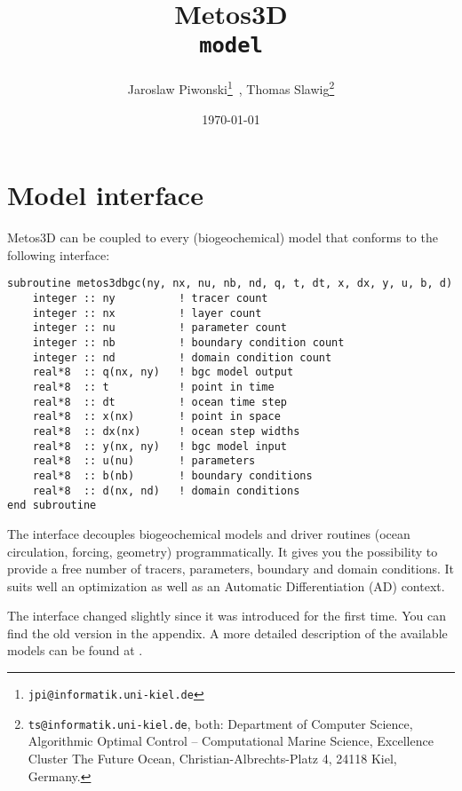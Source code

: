 \documentclass{article}
\begin{document}
%
%
\title{
Metos3D \\
\medskip
\texttt{model}
}
\author{
Jaroslaw Piwonski\thanks{\texttt{jpi@informatik.uni-kiel.de}} \,,
Thomas Slawig\thanks{\texttt{ts@informatik.uni-kiel.de},
both: Department of Computer Science, Algorithmic Optimal Control -- Computational Marine Science,
Excellence Cluster The Future Ocean, Christian-Albrechts-Platz 4, 24118 Kiel, Germany.}
}
\date{\today}
\maketitle

%
%
\section{Model interface}

Metos3D \citep[][]{PiwSla16} can be coupled to every (biogeochemical) model that
conforms to the following interface:

\begin{verbatim}
subroutine metos3dbgc(ny, nx, nu, nb, nd, q, t, dt, x, dx, y, u, b, d)
    integer :: ny          ! tracer count
    integer :: nx          ! layer count
    integer :: nu          ! parameter count
    integer :: nb          ! boundary condition count
    integer :: nd          ! domain condition count
    real*8  :: q(nx, ny)   ! bgc model output
    real*8  :: t           ! point in time
    real*8  :: dt          ! ocean time step
    real*8  :: x(nx)       ! point in space
    real*8  :: dx(nx)      ! ocean step widths
    real*8  :: y(nx, ny)   ! bgc model input
    real*8  :: u(nu)       ! parameters
    real*8  :: b(nb)       ! boundary conditions
    real*8  :: d(nx, nd)   ! domain conditions
end subroutine
\end{verbatim}

The interface decouples biogeochemical models and driver routines
(ocean circulation, forcing, geometry) programmatically.
%
It gives you the possibility to provide a free number of tracers,
parameters, boundary and domain conditions. It suits well an
optimization as well as an Automatic Differentiation (AD) context.

The interface changed slightly since it was introduced for the first time.
You can find the old version in the appendix. A more detailed description
of the available models can be found at \citep[][]{PiwSla16}.
\end{document}
